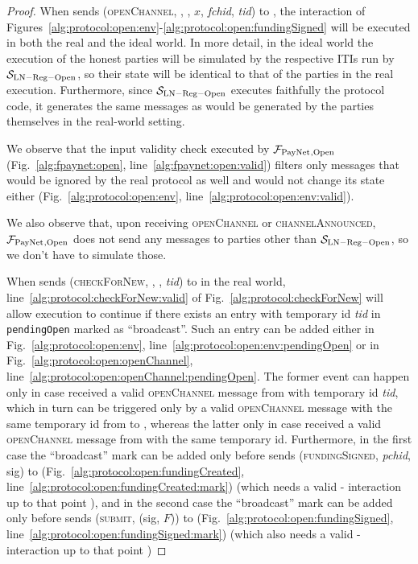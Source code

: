 \begin{proof}
  When \environment{} sends (\textsc{openChannel}, \alice, \bob, $x$,
  \textit{fchid}, \textit{tid}) to \alice, the interaction of
  Figures~\ref{alg:protocol:open:env}-\ref{alg:protocol:open:fundingSigned}
  will be executed in both the real and the ideal world. In more detail, in
  the ideal world the execution of the honest parties will be simulated by the
  respective ITIs run by $\mathcal{S}_{\mathrm{LN - Reg - Open}}$, so their
  state will be identical to that of the parties in the real execution.
  Furthermore, since $\mathcal{S}_{\mathrm{LN - Reg - Open}}$ executes
  faithfully the protocol code, it generates the same messages as would be
  generated by the parties themselves in the real-world setting.

  We observe that the input validity check executed by $\mathcal{F}_{\mathrm{PayNet}}{}_{\mathrm{,
  Open}}$ (Fig.~\ref{alg:fpaynet:open}, line~\ref{alg:fpaynet:open:valid})
  filters only messages that would be ignored by the real protocol as well and
  would not change its state either (Fig.~\ref{alg:protocol:open:env},
  line~\ref{alg:protocol:open:env:valid}).

  We also observe that, upon receiving \textsc{openChannel} or
  \textsc{channelAnnounced}, $\mathcal{F}_{\mathrm{PayNet}}{}_{\mathrm{, Open}}$ does not send any
  messages to parties other than $\mathcal{S}_{\mathrm{LN - Reg - Open}}$, so
  we don't have to simulate those.

  When \environment{} sends (\textsc{checkForNew}, \alice, \bob, \textit{tid}) to
  \alice{} in the real world, line~\ref{alg:protocol:checkForNew:valid} of
  Fig.~\ref{alg:protocol:checkForNew} will allow execution to continue if there
  exists an entry with temporary id \textit{tid} in \texttt{pendingOpen}
  marked as ``broadcast''. Such an entry can be added either in
  Fig.~\ref{alg:protocol:open:env},
  line~\ref{alg:protocol:open:env:pendingOpen} or in
  Fig.~\ref{alg:protocol:open:openChannel},
  line~\ref{alg:protocol:open:openChannel:pendingOpen}. The former event can
  happen only in case \alice{} received a valid \textsc{openChannel} message
  from \bob{} with temporary id \textit{tid}, which in turn can be triggered
  only by a valid \textsc{openChannel} message with the same temporary id from
  \environment{} to \bob{}, whereas the latter only in case \alice{} received
  a valid \textsc{openChannel} message from \environment{} with the same
  temporary id. Furthermore, in the first case the ``broadcast'' mark can be
  added only before \alice{} sends (\textsc{fundingSigned}, \textit{pchid},
  sig) to \bob{} (Fig.~\ref{alg:protocol:open:fundingCreated},
  line~\ref{alg:protocol:open:fundingCreated:mark}) (which needs a valid
  \alice-\bob{} interaction up to that point ), and in
  the second case the ``broadcast'' mark can be added only before \alice{}
  sends (\textsc{submit}, (sig, $F$)) to \ledger{}
  (Fig.~\ref{alg:protocol:open:fundingSigned},
  line~\ref{alg:protocol:open:fundingSigned:mark}) (which also needs a valid
  \alice-\bob{} interaction up to that point )


\end{proof}
